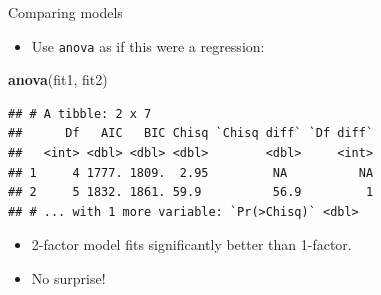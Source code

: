 \documentclass[
  ignorenonframetext,
]{beamer}
\newenvironment{Shaded}{\begin{snugshade}}{\end{snugshade}}
\newcommand{\KeywordTok}[1]{\textcolor[rgb]{0.13,0.29,0.53}{\textbf{#1}}}
\newcommand{\NormalTok}[1]{#1}
\providecommand{\tightlist}{%
  \setlength{\itemsep}{0pt}\setlength{\parskip}{0pt}}
\begin{document}
\begin{frame}[fragile]{Comparing models}
\protect\hypertarget{comparing-models}{}

\begin{itemize}
\tightlist
\item
  Use \texttt{anova} as if this were a regression:
\end{itemize}

\scriptsize

\begin{Shaded}
\begin{Highlighting}[]
\KeywordTok{anova}\NormalTok{(fit1, fit2)}
\end{Highlighting}
\end{Shaded}

\begin{verbatim}
## # A tibble: 2 x 7
##      Df   AIC   BIC Chisq `Chisq diff` `Df diff`
##   <int> <dbl> <dbl> <dbl>        <dbl>     <int>
## 1     4 1777. 1809.  2.95         NA          NA
## 2     5 1832. 1861. 59.9          56.9         1
## # ... with 1 more variable: `Pr(>Chisq)` <dbl>
\end{verbatim}

\normalsize

\begin{itemize}
\item
  2-factor model fits significantly better than 1-factor.
\item
  No surprise!
\end{itemize}

\end{frame}
\end{document}
